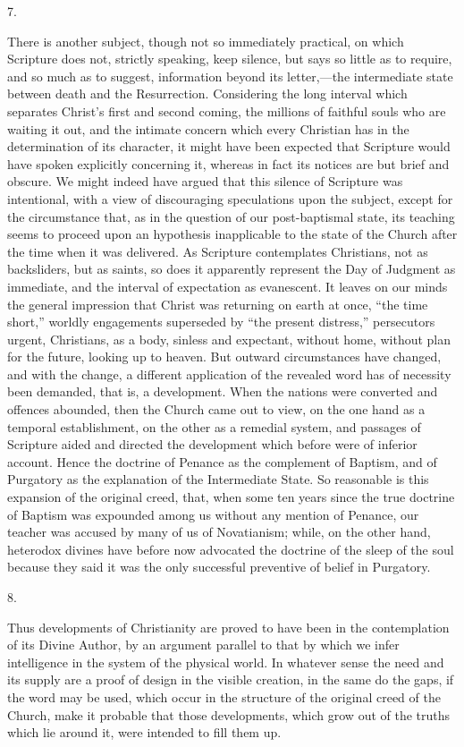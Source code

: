 7.

There is another subject, though not so immediately
practical, on which Scripture does not, strictly
speaking, keep silence, but says so little as to require,
and so much as to suggest, information beyond its
letter,—the intermediate state between death and the
Resurrection. Considering the long interval which
separates Christ's first and second coming, the millions of faithful souls who are waiting it out, and the
intimate concern which every Christian has in the
determination of its character, it might have been
expected that Scripture would have spoken explicitly
concerning it, whereas in fact its notices are but brief
and obscure. We might indeed have argued that this
silence of Scripture was intentional, with a view of
discouraging speculations upon the subject, except for
the circumstance that, as in the question of our
post-baptismal state, its teaching seems to proceed upon
an hypothesis inapplicable to the state of the Church
after the time when it was delivered. As Scripture
contemplates Christians, not as backsliders, but as
saints, so does it apparently represent the Day of
Judgment as immediate, and the interval of expectation as
evanescent. It leaves on our minds the general impression
that Christ was returning on earth at once, ``the
time short,'' worldly engagements superseded by
``the present distress,'' persecutors urgent,
Christians, as a body, sinless and expectant, without
home, without plan for the future, looking up to heaven.
But outward circumstances have changed, and with the
change, a different application of the revealed word has
of necessity been demanded, that is, a development. When
the nations were converted and offences abounded, then
the Church came out to view, on the one hand as a
temporal establishment, on the other as a remedial
system, and passages of Scripture aided and directed the
development which before were of inferior account. Hence
the doctrine of Penance as the complement of Baptism, and
of Purgatory as the explanation of the Intermediate
State. So reasonable is this expansion of the original
creed, that, when some ten years since the true doctrine
of Baptism was expounded among us without any mention of
Penance, our teacher was accused by many of us of
Novatianism; while, on the other hand, heterodox divines
have before now advocated the doctrine of the sleep of
the soul because they said it was the only successful
preventive of belief in Purgatory.

8.

Thus developments of Christianity are proved to have
been in the contemplation of its Divine Author, by an
argument parallel to that by which we infer intelligence
in the system of the physical world. In whatever sense
the need and its supply are a proof of design in the
visible creation, in the same do the gaps, if the word
may be used, which occur in the structure of the original
creed of the Church, make it probable that those
developments, which grow out of the truths which lie
around it, were intended to fill them up.

